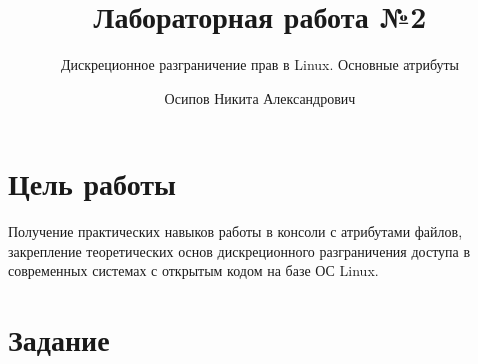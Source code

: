 \documentclass[
  english,
  russian,
  12pt,
  a4paper,
  DIV=11,
  numbers=noendperiod]{scrreprt}
\title{Лабораторная работа №2}
\subtitle{Дискреционное разграничение прав в Linux. Основные атрибуты}
\author{Осипов Никита Александрович}
\date{}
\renewcommand*\contentsname{Содержание}
\newcommand\contentsname{Содержание}
\begin{document}
\maketitle

\renewcommand*\contentsname{Содержание}
{
\setcounter{tocdepth}{1}
\tableofcontents
}
\listoffigures
\listoftables

\chapter{Цель
работы}\label{ux446ux435ux43bux44c-ux440ux430ux431ux43eux442ux44b}

Получение практических навыков работы в консоли с атрибутами файлов,
закрепление теоретических основ дискреционного разграничения доступа в
современных системах с открытым кодом на базе ОС Linux.

\chapter{Задание}\label{ux437ux430ux434ux430ux43dux438ux435}
\end{document}
